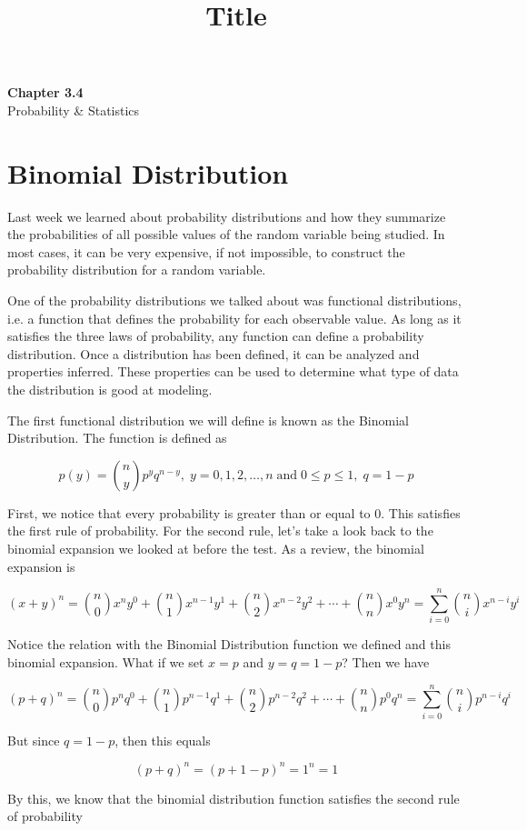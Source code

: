 \documentclass[11pt]{article}
\theoremstyle{definition}
\begin{document}
\title{Title}

\thispagestyle{empty}

\begin{center}
{\LARGE \bf Chapter 3.4}\\
{\large Probability \& Statistics}
\end{center}

\section{Binomial Distribution}

Last week we learned about probability distributions and how they summarize the probabilities of all possible values of the random variable being studied. In most cases, it can be very expensive, if not impossible, to construct the probability distribution for a random variable.

One of the probability distributions we talked about was functional distributions, i.e. a function that defines the probability for each observable value. As long as it satisfies the three laws of probability, any function can define a probability distribution. Once a distribution has been defined, it can be analyzed and properties inferred. These properties can be used to determine what type of data the distribution is good at modeling.

The first functional distribution we will define is known as the Binomial Distribution. The function is defined as

$$
	p(y) = {n \choose y} p^y q^{n-y}, \; y = 0,1,2,\ldots,n \; \text{and} \; 0 \leq p \leq 1, \; q = 1-p
$$

First, we notice that every probability is greater than or equal to 0. This satisfies the first rule of probability. For the second rule, let's take a look back to the binomial expansion we looked at before the test. As a review, the binomial expansion is

$$
	(x + y)^n = {n \choose 0} x^n y^0 + {n \choose 1} x^{n-1}y^1 + {n \choose 2} x^{n-2}y^2 + \cdots + {n \choose n} x^0 y^n = \sum_{i=0}^n {n \choose i} x^{n-i}y^i
$$

Notice the relation with the Binomial Distribution function we defined and this binomial expansion. What if we set $x=p$ and $y=q=1-p$? Then we have

$$
	(p + q)^n = {n \choose 0} p^n q^0 + {n \choose 1} p^{n-1}q^1 + {n \choose 2} p^{n-2}q^2 + \cdots + {n \choose n} p^0 q^n = \sum_{i=0}^n {n \choose i} p^{n-i}q^i
$$

But since $q = 1-p$, then this equals

$$
	(p + q)^n = (p + 1 - p)^n = 1^n = 1
$$

By this, we know that the binomial distribution function satisfies the second rule of probability
\end{document}
